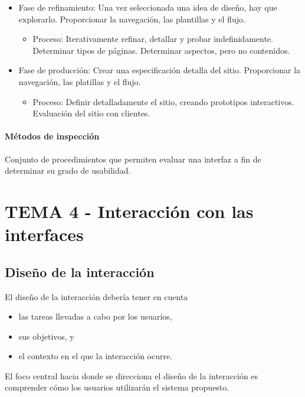\documentclass[12pt, twoside, openright]{report} %
\begin{document}
\begin{itemize}
\begin{itemize}
		      \item Fase de refinamiento: Una vez seleccionada una idea de diseño, hay que explorarlo. Proporcionar la navegación, las plantillas y el flujo.
		            \begin{itemize}
			            \item Proceso: Iterativamente refinar, detallar y probar indefinidamente. Determinar tipos de páginas. Determinar aspectos, pero no contenidos.\end{itemize}
		      \item Fase de producción: Crear una especificación detalla del sitio. Proporcionar la navegación, las platillas y el flujo.
		            \begin{itemize}
			            \item Proceso: Definir detalladamente el sitio, creando prototipos interactivos. Evaluación del sitio con clientes.\end{itemize}
	      \end{itemize}
\end{itemize}



\subsubsection{Métodos de inspección} Conjunto de procedimientos que permiten
evaluar una interfaz a fin de determinar su grado de usabilidad.

\chapter{TEMA 4 - Interacción con las interfaces}

\section{Diseño de la interacción}

El diseño de la interacción debería tener en cuenta

\begin{itemize}
	\item las tareas llevadas a cabo por los usuarios,
	\item sus objetivos, y
	\item el contexto en el que la interacción ocurre.
\end{itemize}

El foco central hacia donde se direcciona el diseño de la
interacción es comprender cómo los usuarios utilizarán el sistema
propuesto.
\end{document}
